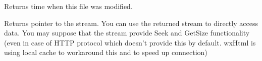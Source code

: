 \label{wxfsfilegetmodificationtime}


Returns time when this file was modified.

\label{wxfsfilegetstream}


Returns pointer to the stream. You can use the returned
stream to directly access data. You may suppose
that the stream provide Seek and GetSize functionality
(even in case of HTTP protocol which doesn't provide
this by default. wxHtml is using local cache to workaround
this and to speed up connection)

